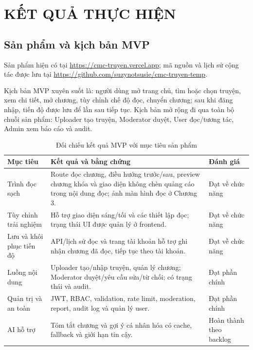 \chapter{KẾT QUẢ THỰC HIỆN}

\section{Sản phẩm và kịch bản MVP}

Sản phẩm hiện có tại \url{https://cmc-truyen.vercel.app}; mã nguồn và lịch sử cộng tác được lưu tại \url{https://github.com/suzynotsusie/cmc-truyen-temp}. 

Kịch bản MVP xuyên suốt là: người dùng mở trang chủ, tìm hoặc chọn truyện, xem chi tiết, mở chương, tùy chỉnh chế độ đọc, chuyển chương; sau khi đăng nhập, tiến độ được lưu để lần sau tiếp tục. Kịch bản mở rộng đi qua toàn bộ chuỗi sản phẩm: Uploader tạo truyện, Moderator duyệt, User đọc/tương tác, Admin xem báo cáo và audit.

\begin{table}[H]
\centering
\caption{Đối chiếu kết quả MVP với mục tiêu sản phẩm}
\label{tab:mvp-results}
\begin{tabularx}{\textwidth}{|>{\RaggedRight\arraybackslash}p{3.3cm}|>{\RaggedRight\arraybackslash}X|>{\centering\arraybackslash}p{2.2cm}|}
\hline
\textbf{Mục tiêu} & \textbf{Kết quả và bằng chứng} & \textbf{Đánh giá} \\
\hline
Trình đọc sạch & Route đọc chương, điều hướng trước/sau, preview chương khóa và giao diện không chèn quảng cáo trong nội dung đọc; ảnh màn hình đọc ở Chương 3. & Đạt về chức năng \\
\hline
Tùy chỉnh trải nghiệm & Hỗ trợ giao diện sáng/tối và các thiết lập đọc; trạng thái UI được quản lý ở frontend. & Đạt về chức năng \\
\hline
Lưu và khôi phục tiến độ & API/lịch sử đọc và trang tài khoản hỗ trợ ghi nhận chương đã đọc, tiếp tục theo tài khoản. & Đạt về chức năng \\
\hline
Luồng nội dung & Uploader tạo/nhập truyện, quản lý chương; Moderator duyệt/yêu cầu sửa/từ chối; có trạng thái và audit. & Đạt phần chính \\
\hline
Quản trị và an toàn & JWT, RBAC, validation, rate limit, moderation, report, audit log và quản lý user. & Đạt phần chính \\
\hline
AI hỗ trợ & Tóm tắt chương và gợi ý cá nhân hóa có cache, fallback và giới hạn tin cậy. & Hoàn thành theo backlog \\
\hline
\end{tabularx}
\end{table}

